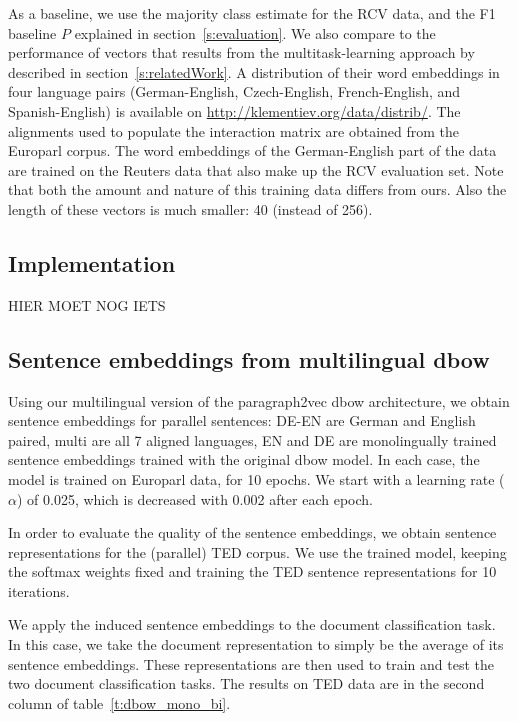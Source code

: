 As a baseline, we use the majority class estimate for the RCV data, and the F1 baseline $P$ explained in section~\ref{s:evaluation}. We also compare to the performance of vectors that results from the multitask-learning approach by \cite{klementiev2012inducing} described in section~\ref{s:relatedWork}. A distribution of their word embeddings in four language pairs (German-English, Czech-English, French-English, and Spanish-English) is available on \url{http://klementiev.org/data/distrib/}. The alignments used to populate the interaction matrix are obtained from the Europarl corpus. The word embeddings of the German-English part of the data are trained on the Reuters data that also make up the RCV evaluation set. Note that both the amount and nature of this training data differs from ours. Also the length of these vectors is much smaller: 40 (instead of 256).



\subsection{Implementation}
{\color{red} HIER MOET NOG IETS}

\subsection{Sentence embeddings from multilingual dbow}
Using our multilingual version of the paragraph2vec dbow architecture, we obtain sentence embeddings for parallel sentences: DE-EN are German and English paired, multi are all 7 aligned languages, EN and DE are monolingually trained sentence embeddings trained with the original dbow model. In each case, the model is trained on Europarl data, for 10 epochs. We start with a learning rate ($\alpha$) of 0.025, which is decreased with 0.002 after each epoch.

 In order to evaluate the quality of the sentence embeddings, we obtain sentence representations for the (parallel) TED corpus. We use the trained model, keeping the softmax weights fixed and training the TED sentence representations for 10 iterations.

We apply the induced sentence embeddings to the document classification task. In this case, we take the document representation to simply be the average of its sentence embeddings. These representations are then used to train and test the two document classification tasks. The results on TED data are in the second column of table~\ref{t:dbow_mono_bi}.

